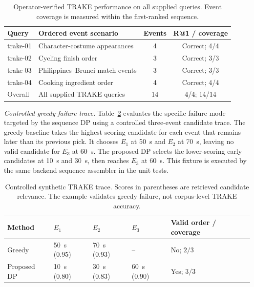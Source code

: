 \documentclass[conference]{IEEEtran}
\begin{document}
\begin{table}[!t]
\centering
\caption{Operator-verified TRAKE performance on all supplied queries. Event
coverage is measured within the first-ranked sequence.}
\label{tab:trake-results}
\scriptsize
\setlength{\tabcolsep}{2pt}
\begin{tabularx}{\columnwidth}{@{}>{\ttfamily\raggedright\arraybackslash}p{}Xcc@{}}
\toprule
Query & Ordered event scenario & Events & R@1 / coverage \\
\midrule
trake-01 & Character-costume appearances & 4 & Correct; 4/4 \\
trake-02 & Cycling finish order & 3 & Correct; 3/3 \\
trake-03 & Philippines--Brunei match events & 3 & Correct; 3/3 \\
trake-04 & Cooking ingredient order & 4 & Correct; 4/4 \\
\midrule
Overall & All supplied TRAKE queries & 14 & 4/4; 14/14 \\
\bottomrule
\end{tabularx}
\end{table}

\textit{Controlled greedy-failure trace.} Table~\ref{tab:trake-controlled}
evaluates the specific failure mode targeted by the sequence DP using a
controlled three-event candidate trace. The greedy baseline takes the
highest-scoring candidate for each event that remains later than its previous
pick. It chooses $E_1$ at 50~s and $E_2$ at 70~s, leaving no valid candidate for
$E_3$ at 60~s. The proposed DP selects the lower-scoring early candidates at
10~s and 30~s, then reaches $E_3$ at 60~s. This fixture is executed by the same
backend sequence assembler in the unit tests.

\begin{table}[!t]
\centering
\caption{Controlled synthetic TRAKE trace. Scores in parentheses are retrieved
candidate relevance. The example validates greedy failure, not corpus-level
TRAKE accuracy.}
\label{tab:trake-controlled}
\scriptsize
\setlength{\tabcolsep}{2pt}
\begin{tabularx}{\columnwidth}{@{}>{\raggedright\arraybackslash}p{}XXXX@{}}
\toprule
Method & $E_1$ & $E_2$ & $E_3$ & Valid order / coverage \\
\midrule
Greedy & 50~s (0.95) & 70~s (0.93) & -- & No; $2/3$ \\
Proposed DP & 10~s (0.80) & 30~s (0.83) & 60~s (0.90) & Yes; $3/3$ \\
\bottomrule
\end{tabularx}
\end{table}
\end{document}
